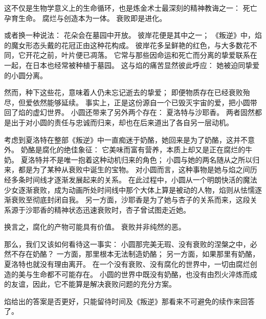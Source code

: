 这不仅是生物学意义上的生命循环，也是炼金术士最深刻的精神教诲之一：
死亡孕育生命。
腐烂与创造本为一体。
衰败即是进化。

或者换一种说法：
花朵会在墓园中开放。
彼岸花便是其中之一；
《叛逆》中，焰的魔女形态头戴的花冠正由这种花构成。
彼岸花多呈鲜艳的红色，与大多数花不同，它开花之前，叶片便已凋落。
它常与那些因命运和死亡而分离的挚爱联系在一起，在日本也经常被种植于墓园\cite{klingaman2000red-spiderlily}。
这与焰的痛苦显然彼此呼应：
她被迫同挚爱的小圆分离。

然而，种下这些花，意味着人仍未忘记逝去的挚爱；
即便物质存在已经衰败殆尽，但爱依然能够延续。
事实上，正是这份源自一个已毁灭宇宙的爱，把小圆带回了焰的虚幻世界。
小圆还带来了另外两个存在：
夏洛特与沙耶香。
两者固然都是出于对小圆的责任与忠诚而归来，却也在后来道出了各自另一层动机。

考虑到夏洛特在整部《叛逆》中一直痴迷于奶酪，她回来是为了奶酪，这并不意外。
奶酪是腐化的绝佳象征：
它美味而富有营养，本质上却又是正在腐烂的牛奶。
夏洛特并不是唯一抱着这种动机归来的角色；
小圆与她的两名随从之所以归来，都是为了某种从衰败中诞生的宝物。
对小圆而言，这种事物是她与焰之间历经多条时间线才逐渐发展起来的关系。
在此过程中，小圆从一个明朗快活的魔法少女逐渐衰败，成为动画所处时间线中那个大体上算是被动的人物，焰则从怯懦逐渐衰败至彻底封闭自我。
另一方面，沙耶香是为了她与杏子的关系而来，这段关系源于沙耶香的精神状态迅速衰败时，杏子曾试图走近她。

换言之，腐化的产物可能具有价值。
衰败并非纯然的恶。

那么，我们又该如何看待这一事实：
小圆那完美无瑕、没有衰败的涅槃之中，必然不存在奶酪？
一方面，那里根本无法制造奶酪；
另一方面，如果那里有奶酪，夏洛特也就没有理由离开。
在一个没有衰败、没有腐化的世界中，一切由腐烂创造的美与生命都不可能存在。
小圆的世界中既没有奶酪，也没有由烈火淬炼而成的友谊，因此，它不能算是解决衰败问题的充分方案。

焰给出的答案是否更好，只能留待时间及《叛逆》那看来不可避免的续作来回答了。
